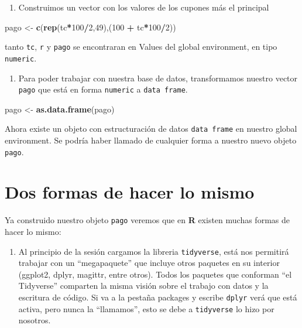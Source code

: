 \documentclass[12pt,]{book}
\newenvironment{Shaded}{\begin{snugshade}}{\end{snugshade}}
\newcommand{\KeywordTok}[1]{\textcolor[rgb]{0.13,0.29,0.53}{\textbf{#1}}}
\newcommand{\DecValTok}[1]{\textcolor[rgb]{0.00,0.00,0.81}{#1}}
\newcommand{\StringTok}[1]{\textcolor[rgb]{0.31,0.60,0.02}{#1}}
\newcommand{\OperatorTok}[1]{\textcolor[rgb]{0.81,0.36,0.00}{\textbf{#1}}}
\newcommand{\NormalTok}[1]{#1}
\providecommand{\tightlist}{%
  \setlength{\itemsep}{0pt}\setlength{\parskip}{0pt}}
\begin{document}
\begin{enumerate}
\def\labelenumi{\arabic{enumi}.}
\setcounter{enumi}{1}
\tightlist
\item
  Construimos un vector con los valores de los cupones más el principal
\end{enumerate}

\begin{Shaded}
\begin{Highlighting}[]
\NormalTok{pago <-}\StringTok{ }\KeywordTok{c}\NormalTok{(}\KeywordTok{rep}\NormalTok{(tc}\OperatorTok{*}\DecValTok{100}\OperatorTok{/}\DecValTok{2}\NormalTok{,}\DecValTok{49}\NormalTok{),(}\DecValTok{100} \OperatorTok{+}\StringTok{ }\NormalTok{tc}\OperatorTok{*}\DecValTok{100}\OperatorTok{/}\DecValTok{2}\NormalTok{))}
\end{Highlighting}
\end{Shaded}

tanto \texttt{tc}, \texttt{r} y \texttt{pago} se encontraran en Values
del global environment, en tipo \texttt{numeric}.

\begin{enumerate}
\def\labelenumi{\arabic{enumi}.}
\setcounter{enumi}{2}
\tightlist
\item
  Para poder trabajar con nuestra base de datos, transformamos nuestro
  vector \texttt{pago} que está en forma \texttt{numeric} a
  \texttt{data\ frame}.
\end{enumerate}

\begin{Shaded}
\begin{Highlighting}[]
\NormalTok{pago <-}\StringTok{ }\KeywordTok{as.data.frame}\NormalTok{(pago)}
\end{Highlighting}
\end{Shaded}

Ahora existe un objeto con estructuración de datos \texttt{data\ frame}
en nuestro global environment. Se podría haber llamado de cualquier
forma a nuestro nuevo objeto \texttt{pago}.

\section{Dos formas de hacer lo
mismo}\label{dos-formas-de-hacer-lo-mismo}

Ya construido nuestro objeto \texttt{pago} veremos que en \textbf{R}
existen muchas formas de hacer lo mismo:

\begin{enumerate}
\def\labelenumi{\arabic{enumi}.}
\tightlist
\item
  Al principio de la sesión cargamos la libreria \texttt{tidyverse},
  está nos permitirá trabajar con un ``megapaquete'' que incluye otros
  paquetes en su interior (ggplot2, dplyr, magittr, entre otros). Todos
  los paquetes que conforman ``el Tidyverse'' comparten la misma visión
  sobre el trabajo con datos y la escritura de código. Si va a la
  pestaña packages y escribe \texttt{dplyr} verá que está activa, pero
  nunca la ``llamamos'', esto se debe a \texttt{tidyverse} lo hizo por
  nosotros.
\end{enumerate}
\end{document}

